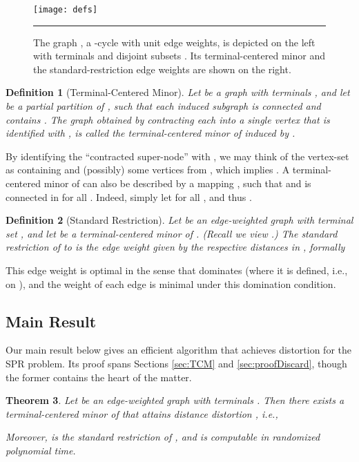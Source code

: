 \documentclass[twoside,leqno,twocolumn]{article}
\newtheorem{definition}[Definition]{Definition}
\newtheorem{theorem}{Theorem}[section]
\newtheorem{definition}[theorem]{Definition}
\begin{document}
\begin{figure}[ht]
  \begin{center}
    \label{fig:defs}
    \texttt{[image: defs]}
    \caption{The graph , a -cycle with unit edge weights, 
is depicted on the left with  terminals and disjoint subsets . 
Its terminal-centered minor  and the standard-restriction 
edge weights are shown on the right.}
  \end{center}
\hrule
\end{figure}

\begin{definition}[Terminal-Centered Minor] \label{defn:tcm}
Let  be a graph with  terminals ,
and let  be a partial partition of , 
such that each induced subgraph  is connected and contains .
The graph  obtained by contracting each  
into a single vertex that is identified with , 
is called the {\em terminal-centered minor} of  induced by .
\end{definition}

By identifying the ``contracted super-node''  with , 
we may think of the vertex-set  as containing 
and (possibly) some vertices from ,
which implies .
A terminal-centered minor  of  
can also be described by a mapping , 
such that  
and  is connected in  for all .
Indeed, simply let  for all , 
and thus . 

\begin{definition}[Standard Restriction] \label{defn:sr}
Let  be an edge-weighted graph with terminal set ,
and let  be a terminal-centered minor of .
(Recall we view .)
The {\em standard restriction} of  to  is the edge weight 
given by the respective distances in , formally

\end{definition}

This edge weight  is optimal in the sense that 
 dominates  (where it is defined, i.e., on ),
and the weight of each edge  is minimal
under this domination condition.

\subsection{Main Result} \label{sec:results}

Our main result below gives an efficient algorithm 
that achieves  distortion for the SPR problem.
Its proof spans Sections \ref{sec:TCM} and \ref{sec:proofDiscard},
though the former contains the heart of the matter.

\begin{theorem} \label{thm:main}
Let  be an edge-weighted graph with  terminals .
Then there exists a terminal-centered minor  of  that attains distance distortion , i.e., 

Moreover,  is the standard restriction of ,
and  is computable in randomized polynomial time.
\end{theorem}
\end{document}

